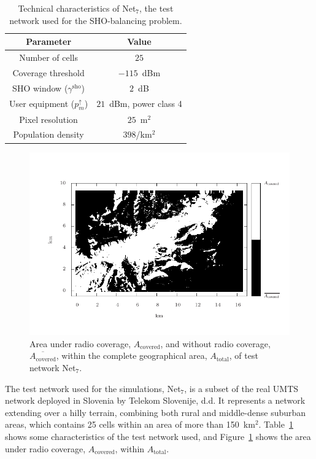 \begin{table}
\caption{Technical characteristics of Net$_{7}$, the test network used for
the SHO-balancing problem. \label{tab:07-Test_network_properties}}


\centering

\begin{tabular}{cc}
\hline 
Parameter & Value\tabularnewline
\hline 
Number of cells & $25$\tabularnewline
Coverage threshold & $-115$~dBm\tabularnewline
SHO window ($\gamma^{\mathrm{sho}}$) & $2$~dB\tabularnewline
User equipment ($p_{m}^{\uparrow}$) & $21$~dBm, power class 4\tabularnewline
Pixel resolution & $25$~m$^{2}$\tabularnewline
Population density & $398$/km$^{2}$\tabularnewline
\hline 
\end{tabular}
\end{table}


\begin{figure}
\centering

\includegraphics[width=1\textwidth]{07-experimental_evaluation-sho_balancing/img/coverage_area}

\caption{Area under radio coverage, $A_{\mathrm{covered}}$, and without radio
coverage, $\overline{A_{\mathrm{covered}}}$, within the complete
geographical area, $A_{\mathrm{total}}$, of test network Net$_{7}$.\label{fig:07-Coverage_areas}}
\end{figure}


\noindent The test network used for the simulations, Net$_{7}$, is
a subset of the real UMTS network deployed in Slovenia by Telekom
Slovenije, d.d. It represents a network extending over a hilly terrain,
combining both rural and middle-dense suburban areas, which contains
25 cells within an area of more than 150~km$^{2}$. Table~\ref{tab:07-Test_network_properties}
shows some characteristics of the test network used, and Figure~\ref{fig:07-Coverage_areas}
shows the area under radio coverage, $A_{\mathrm{covered}}$, within
$A_{\mathrm{total}}$.


